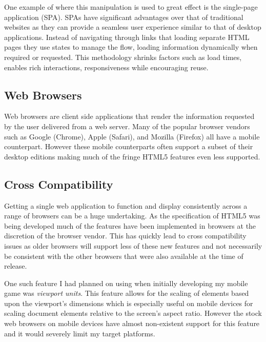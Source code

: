 \documentclass[final]{cmpreport}
\begin{document}
One example of where this manipulation is used to great effect is the single-page application (SPA). SPAs have significant advantages over that of traditional websites as they can provide a seamless user experience similar to that of desktop applications. Instead of navigating through links that loading separate HTML pages they use states to manage the flow, loading information dynamically when required or requested. This methodology shrinks factors such as load times, enables rich interactions, responsiveness while encouraging reuse. \citep{MTakada}

\subsection{Web Browsers}
Web browsers are client side applications that render the information requested by the user delivered from a web server. Many of the popular browser vendors such as Google (Chrome), Apple (Safari), and Mozilla (Firefox) all have a mobile counterpart. However these mobile counterparts often support a subset of their desktop editions making much of the fringe HTML5 features even less supported.

\subsection{Cross Compatibility}
Getting a single web application to function and display consistently across a range of browsers can be a huge undertaking. As the specification of HTML5 was being developed much of the features have been implemented in browsers at the discretion of the browser vendor. This has quickly lead to cross compatibility issues as older browsers will support less of these new features and not necessarily be consistent with the other browsers that were also available at the time of release.

One such feature I had planned on using when initially developing my mobile game was \textit{viewport units}. This feature allows for the scaling of elements based upon the viewport's dimensions which is especially useful on mobile devices for scaling document elements relative to the screen's aspect ratio. However the stock web browsers on mobile devices have almost non-existent support for this feature and it would severely limit my target platforms.

\end{document}
